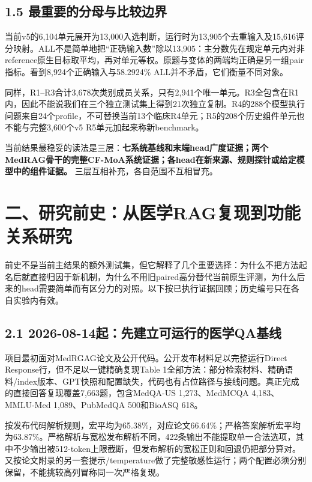\documentclass[
  11pt,
  a4paper,
]{article}
\begin{document}
\subsection{1.5
最重要的分母与比较边界}\label{ux6700ux91cdux8981ux7684ux5206ux6bcdux4e0eux6bd4ux8f83ux8fb9ux754c}

当前v5的6,104单元展开为13,000入选判断，运行时为13,905个去重输入及15,616评分映射。ALL不是简单地把``正确输入数''除以13,905：主分数先在规定单元内对非reference原生目标取平均，再对单元等权。原题与变体的两端均正确是另一组pair指标。看到8,924个正确输入与58.2924\%
ALL并不矛盾，它们衡量不同对象。

同样，R1--R3合计3,678次类别成员关系，只有2,941个唯一单元。R3全包含在R1内，因此不能说我们在三个独立测试集上得到21次独立复制。R4的288个模型执行问题来自24个profile，不可替换当前13个临床R4单元；R5的208个历史组件单元也不能与完整3,600个v5
R5单元加起来称新benchmark。

当前结果最稳妥的读法是三层：\textbf{七系统基线和末端head广度证据；两个MedRAG骨干的完整CF-MoA系统证据；各head在新来源、规则探针或给定模型中的组件证据。}
三层互相补充，各自范围不互相冒充。

\label{early-history}

\section{二、研究前史：从医学RAG复现到功能关系研究}\label{ux4e8cux7814ux7a76ux524dux53f2ux4eceux533bux5b66ragux590dux73b0ux5230ux529fux80fdux5173ux7cfbux7814ux7a76}

前史不是当前主结果的额外测试集，但它解释了几个重要选择：为什么不把方法起名后就直接归因于新机制，为什么不用旧paired高分替代当前原生评测，为什么后来的head需要简单而有区分力的对照。以下按已执行证据回顾；历史编号只在各自实验内有效。

\subsection{2.1
2026-08-14起：先建立可运行的医学QA基线}\label{ux8d77ux5148ux5efaux7acbux53efux8fd0ux884cux7684ux533bux5b66qaux57faux7ebf}

项目最初面对MedRGAG论文及公开代码。公开发布材料足以完整运行Direct
Response行，但不足以一键精确复现Table
1全部方法：部分检索材料、精确语料/index版本、GPT快照和配置缺失，代码也有占位路径与接线问题。真正完成的直接回答复现覆盖7,663题，包含MedQA-US
1,273、MedMCQA 4,183、MMLU-Med 1,089、PubMedQA 500和BioASQ 618。

按发布代码解析规则，宏平均为65.38\%，对应论文66.64\%；严格答案解析宏平均为63.87\%。严格解析与宽松发布解析不同，422条输出不能提取单一合法选项，其中不少输出被512-token上限截断，但发布解析的宽松正则和回退仍把部分算对。又按论文附录的另一套提示/temperature做了完整敏感性运行；两个配置必须分别保留，不能挑较高列冒称同一次严格复现。
\end{document}
